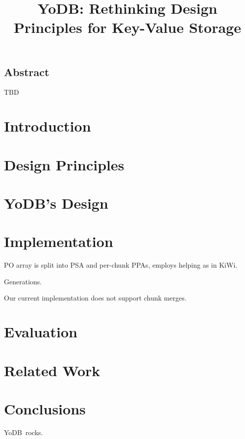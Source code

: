 \documentclass[letterpaper,twocolumn,10pt]{article}
\date{}
\newcommand{\sys}{YoDB}
\begin{document}
\title{\Large \bf \sys: Rethinking Design Principles for Key-Value Storage} 
\author{}
\maketitle

\subsection*{Abstract}

TBD

\section{Introduction}


\section{Design Principles}
\label{sec:principles}


\section{\sys's Design}
\label{sec:design}


\section{Implementation}
\label{sec:impl}

PO array is split into PSA and per-chunk PPAs, employs 
helping as in KiWi. 

Generations.  

Our current implementation does not support chunk merges. 

\section{Evaluation}
\label{sec:eval}


\section{Related Work}
\label{sec:related}


\section{Conclusions}
\label{sec:conclusions}
\sys\ rocks.

%

{\normalsize 
}

\end{document}
